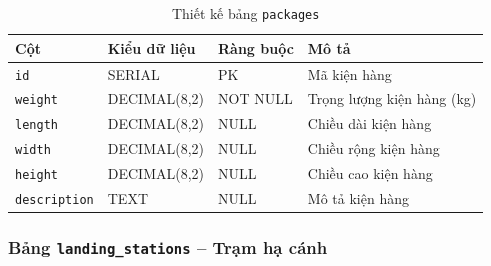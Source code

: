 \begin{table}[H]
\centering
\caption{Thiết kế bảng \texttt{packages}}
\begin{tabularx}{\textwidth}{|l|l|Z|Z|}
\hline
\textbf{Cột} &
\textbf{Kiểu dữ liệu} &
\textbf{Ràng buộc} &
\textbf{Mô tả} \\ \hline

\texttt{id}
& SERIAL
& PK
& Mã kiện hàng \\ \hline

\texttt{weight}
& DECIMAL(8,2)
& NOT NULL
& Trọng lượng kiện hàng (kg) \\ \hline

\texttt{length}
& DECIMAL(8,2)
& NULL
& Chiều dài kiện hàng \\ \hline

\texttt{width}
& DECIMAL(8,2)
& NULL
& Chiều rộng kiện hàng \\ \hline

\texttt{height}
& DECIMAL(8,2)
& NULL
& Chiều cao kiện hàng \\ \hline

\texttt{description}
& TEXT
& NULL
& Mô tả kiện hàng \\ \hline

\end{tabularx}
\end{table}



\subsubsection{Bảng \texttt{landing\_stations} -- Trạm hạ cánh}

